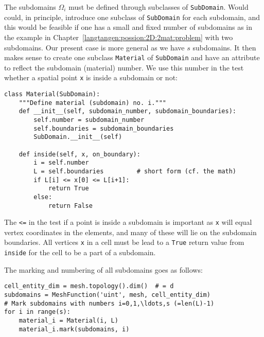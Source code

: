 The subdomains $\Omega_i$ must be defined through subclasses
of {\fontsize{12pt}{12pt}\texttt{SubDomain}}. Would could, in principle,
introduce one subclass of {\fontsize{12pt}{12pt}\texttt{SubDomain}} for each subdomain, and
this would be feasible if one has a small and fixed number of
subdomains as in the example in Chapter~\ref{langtangen:possion:2D:2mat:problem} with
two subdomains. Our present case is more general as we
have $s$ subdomains. It then makes sense to create one
subclass {\fontsize{12pt}{12pt}\texttt{Material}} of {\fontsize{12pt}{12pt}\texttt{SubDomain}} and have an attribute
to reflect the subdomain (material) number. We use this number
in the test whether a spatial point {\fontsize{12pt}{12pt}\texttt{x}} is inside a subdomain or not:
\begin{Verbatim}[fontsize=\fontsize{10pt}{10pt},tabsize=8,baselinestretch=1.05,
fontfamily=tt,xleftmargin=7mm]
class Material(SubDomain):
    """Define material (subdomain) no. i."""
    def __init__(self, subdomain_number, subdomain_boundaries):
        self.number = subdomain_number
        self.boundaries = subdomain_boundaries
        SubDomain.__init__(self)
        
    def inside(self, x, on_boundary):
        i = self.number
        L = self.boundaries         # short form (cf. the math)
        if L[i] <= x[0] <= L[i+1]:
            return True
        else:
            return False
\end{Verbatim}
\noindent
The {\fontsize{12pt}{12pt}\texttt{<=}} in the test if a point is inside a subdomain is important as
{\fontsize{12pt}{12pt}\texttt{x}} will equal vertex coordinates in the elements, and many of these 
will lie
on the subdomain boundaries. All vertices {\fontsize{12pt}{12pt}\texttt{x}}
in a cell must be lead to a {\fontsize{12pt}{12pt}\texttt{True}} return value from {\fontsize{12pt}{12pt}\texttt{inside}}
for the cell to be a part of a subdomain.

The marking and numbering of all subdomains
goes as follows:
\begin{Verbatim}[fontsize=\fontsize{10pt}{10pt},tabsize=8,baselinestretch=1.05,
fontfamily=tt,xleftmargin=7mm]
cell_entity_dim = mesh.topology().dim()  # = d
subdomains = MeshFunction('uint', mesh, cell_entity_dim)
# Mark subdomains with numbers i=0,1,\ldots,s (=len(L)-1)
for i in range(s):
    material_i = Material(i, L)
    material_i.mark(subdomains, i)
\end{Verbatim}
\noindent

